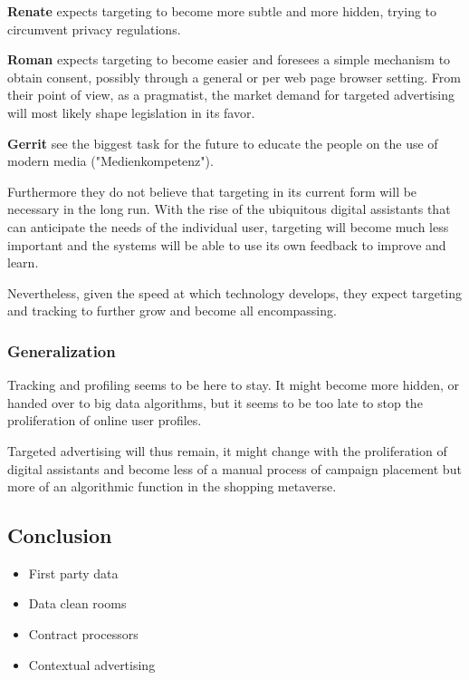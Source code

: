 \textbf{Renate} expects targeting to become more subtle and more hidden, trying to circumvent privacy regulations.

\textbf{Roman} expects targeting to become easier and foresees a simple mechanism to obtain consent, possibly through a general or per web page browser setting. From their point of view, as a pragmatist, the market demand for targeted advertising will most likely shape legislation in its favor.

\textbf{Gerrit} see the biggest task for the future to educate the people on the use of modern media ("Medienkompetenz").

Furthermore they do not believe that targeting in its current form will be necessary in the long run. With the rise of the ubiquitous digital assistants that can anticipate the needs of the individual user, targeting will become much less important and the systems will be able to use its own feedback to improve and learn.

Nevertheless, given the speed at which technology develops, they expect targeting and tracking to further grow and become all encompassing.

\subsubsection{Generalization}

Tracking and profiling seems to be here to stay. It might become more hidden, or handed over to big data algorithms, but it seems to be too late to stop the proliferation of online user profiles. 

Targeted advertising will thus remain, it might change with the proliferation of digital assistants and become less of a manual process of campaign placement but more of an algorithmic function in the shopping metaverse.

\subsection{Conclusion}

\begin{itemize}
 \item First party data 
 \item Data clean rooms
 \item Contract processors
 \item Contextual advertising
\end{itemize}

